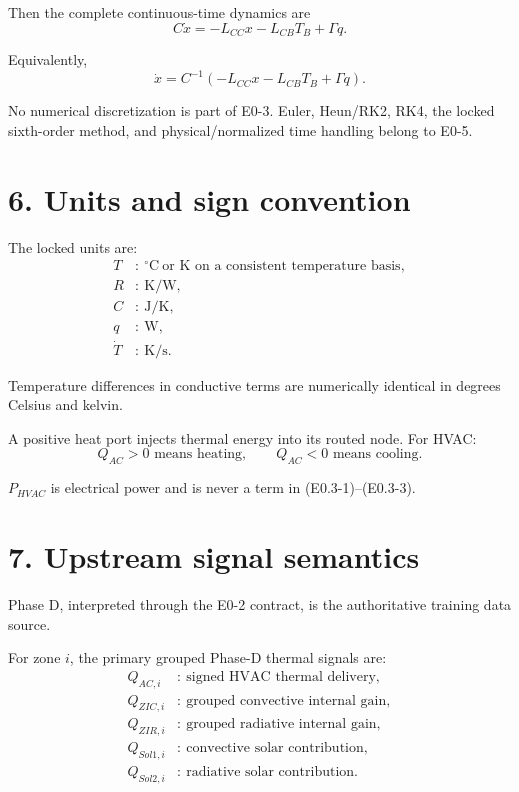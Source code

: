 \documentclass[11pt]{article}
\begin{document}
Then the complete continuous-time dynamics are
\[
\boxed{
C\dot x
=
-L_{CC}x
-L_{CB}T_B
+\Gamma q.
}
\tag{E0.3-2}
\]

Equivalently,
\[
\boxed{
\dot x
=
C^{-1}
\left(
-L_{CC}x
-L_{CB}T_B
+\Gamma q
\right).
}
\tag{E0.3-3}
\]

No numerical discretization is part of E0-3.  Euler, Heun/RK2, RK4, the
locked sixth-order method, and physical/normalized time handling belong to
E0-5.

\section*{6. Units and sign convention}

The locked units are:
\begin{align*}
T &:\ ^\circ\mathrm{C}\ \text{or K on a consistent temperature basis},\\
R &:\ \mathrm{K/W},\\
C &:\ \mathrm{J/K},\\
q &:\ \mathrm{W},\\
\dot T &:\ \mathrm{K/s}.
\end{align*}

Temperature differences in conductive terms are numerically identical in
degrees Celsius and kelvin.

A positive heat port injects thermal energy into its routed node.
For HVAC:
\[
\boxed{
Q_{AC}>0 \text{ means heating},
\qquad
Q_{AC}<0 \text{ means cooling}.
}
\]

$P_{HVAC}$ is electrical power and is never a term in
(E0.3-1)--(E0.3-3).

\section*{7. Upstream signal semantics}

Phase D, interpreted through the E0-2 contract, is the authoritative training
data source.

For zone $i$, the primary grouped Phase-D thermal signals are:
\begin{align*}
Q_{AC,i} &:\ \text{signed HVAC thermal delivery},\\
Q_{ZIC,i} &:\ \text{grouped convective internal gain},\\
Q_{ZIR,i} &:\ \text{grouped radiative internal gain},\\
Q_{Sol1,i} &:\ \text{convective solar contribution},\\
Q_{Sol2,i} &:\ \text{radiative solar contribution}.
\end{align*}
\end{document}
